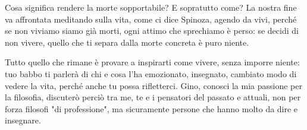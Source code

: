 Cosa significa rendere la morte sopportabile? E sopratutto come? La nostra fine va affrontata meditando sulla vita, come ci dice Spinoza, agendo da vivi, perché se non viviamo siamo già morti, ogni attimo che sprechiamo è perso: se decidi di non vivere, quello che ti separa dalla morte concreta è puro niente. 

Tutto quello che rimane è provare a inspirarti come vivere, senza imporre niente: tuo babbo ti parlerà di chi e cosa l'ha emozionato, insegnato, cambiato modo di vedere la vita, perché anche tu possa rifletterci. Gino, conosci la mia passione per la filosofia, discuterò perciò tra me, te e i pensatori del passato e attuali, non per forza filosofi "di professione", ma sicuramente persone che hanno molto da dire e insegnare. 